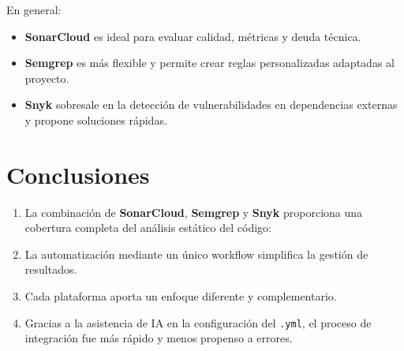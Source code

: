 \documentclass[12pt, a4paper]{article}
\begin{document}
En general:
\begin{itemize}
    \item \textbf{SonarCloud} es ideal para evaluar calidad, métricas y deuda técnica.
    \item \textbf{Semgrep} es más flexible y permite crear reglas personalizadas adaptadas al proyecto.
    \item \textbf{Snyk} sobresale en la detección de vulnerabilidades en dependencias externas y propone soluciones rápidas.
\end{itemize}

\section{Conclusiones}
\begin{enumerate}
    \item La combinación de \textbf{SonarCloud}, \textbf{Semgrep} y \textbf{Snyk} proporciona una cobertura completa del análisis estático del código:
    \item La automatización mediante un único workflow simplifica la gestión de resultados.
    \item Cada plataforma aporta un enfoque diferente y complementario.
    \item Gracias a la asistencia de IA en la configuración del \texttt{.yml}, el proceso de integración fue más rápido y menos propenso a errores.
\end{enumerate}
\end{document}
